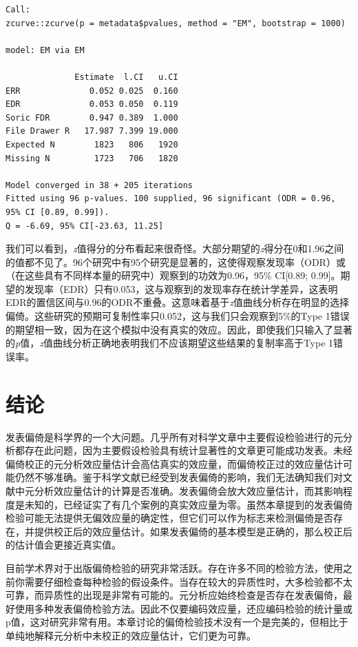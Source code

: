 \documentclass[
  letterpaper,
  DIV=11,
  numbers=noendperiod]{scrreprt}
\begin{document}
\begin{verbatim}
Call:
zcurve::zcurve(p = metadata$pvalues, method = "EM", bootstrap = 1000)

model: EM via EM

              Estimate  l.CI   u.CI
ERR              0.052 0.025  0.160
EDR              0.053 0.050  0.119
Soric FDR        0.947 0.389  1.000
File Drawer R   17.987 7.399 19.000
Expected N        1823   806   1920
Missing N         1723   706   1820

Model converged in 38 + 205 iterations
Fitted using 96 p-values. 100 supplied, 96 significant (ODR = 0.96, 95% CI [0.89, 0.99]).
Q = -6.69, 95% CI[-23.63, 11.25]
\end{verbatim}

我们可以看到，\emph{z}值得分的分布看起来很奇怪。大部分期望的\emph{z}得分在0和1.96之间的值都不见了。96个研究中有95个研究是显著的，这使得观察发现率（ODR）或（在这些具有不同样本量的研究中）观察到的功效为0.96，95\%
CI{[}0.89;
0.99{]}。期望的发现率（EDR）只有0.053，这与观察到的发现率存在统计学差异，这表明EDR的置信区间与0.96的ODR不重叠。这意味着基于\emph{z}值曲线分析存在明显的选择偏倚。这些研究的预期可复制性率只0.052，这与我们只会观察到5\%的Type
1错误的期望相一致，因为在这个模拟中没有真实的效应。因此，即使我们只输入了显著的\emph{p}值，\emph{z}值曲线分析正确地表明我们不应该期望这些结果的复制率高于Type
1错误率。

\hypertarget{ux7ed3ux8bba}{%
\section{结论}\label{ux7ed3ux8bba}}

发表偏倚是科学界的一个大问题。几乎所有对科学文章中主要假设检验进行的元分析都存在此问题，因为主要假设检验具有统计显著性的文章更可能成功发表。未经偏倚校正的元分析效应量估计会高估真实的效应量，而偏倚校正过的效应量估计可能仍然不够准确。鉴于科学文献已经受到发表偏倚的影响，我们无法确知我们对文献中元分析效应量估计的计算是否准确。发表偏倚会放大效应量估计，而其影响程度是未知的，已经证实了有几个案例的真实效应量为零。虽然本章提到的发表偏倚检验可能无法提供无偏效应量的确定性，但它们可以作为标志来检测偏倚是否存在，并提供校正后的效应量估计。如果发表偏倚的基本模型是正确的，那么校正后的估计值会更接近真实值。

目前学术界对于出版偏倚检验的研究非常活跃。存在许多不同的检验方法，使用之前你需要仔细检查每种检验的假设条件。当存在较大的异质性时，大多检验都不太可靠，而异质性的出现是非常有可能的。元分析应始终检查是否存在发表偏倚，最好使用多种发表偏倚检验方法。因此不仅要编码效应量，还应编码检验的统计量或p值，这对研究非常有用。本章讨论的偏倚检验技术没有一个是完美的，但相比于单纯地解释元分析中未校正的效应量估计，它们更为可靠。
\end{document}
